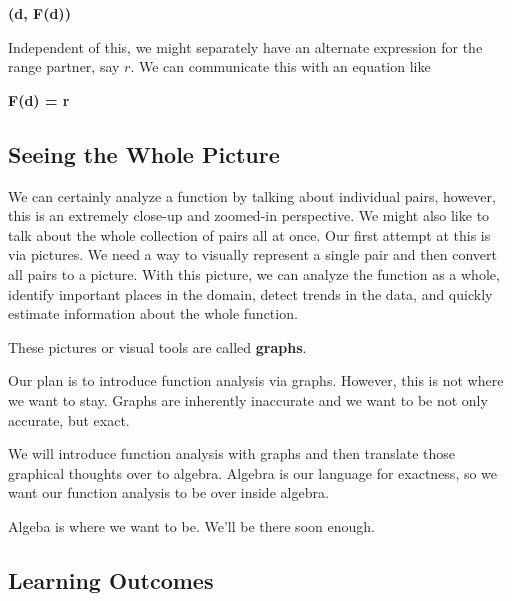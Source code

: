 \documentclass{ximera}
\begin{document}
\begin{center}
\textbf{\textcolor{purple!85!blue}{(d, F(d))}}
\end{center}




Independent of this, we might separately have an alternate expression for the range partner, say $r$.  We can communicate this with an equation like




\begin{center}
\textbf{\textcolor{purple!85!blue}{F(d) = r}}
\end{center}


\subsection*{Seeing the Whole Picture}

We can certainly analyze a function by talking about individual pairs, however, this is an extremely close-up and zoomed-in perspective. We might also like to talk about the whole collection of pairs all at once.  Our first attempt at this is via pictures. We need a way to visually represent a single pair and then convert all pairs to a picture.  With this picture, we can analyze the function as a whole, identify important places in the domain, detect trends in the data, and quickly estimate information about the whole function. 

These pictures or visual tools are called \textbf{\textcolor{blue!55!black}{graphs}}. 



Our plan is to introduce function analysis via graphs.  However, this is not where we want to stay.  Graphs are inherently inaccurate and we want to be not only accurate, but exact.  

We will introduce function analysis with graphs and then translate those graphical thoughts over to algebra. Algebra is our language for exactness, so we want our function analysis to be over inside algebra. 

Algeba is where we want to be.  We'll be there soon enough. 







\subsection*{Learning Outcomes}
\end{document}
